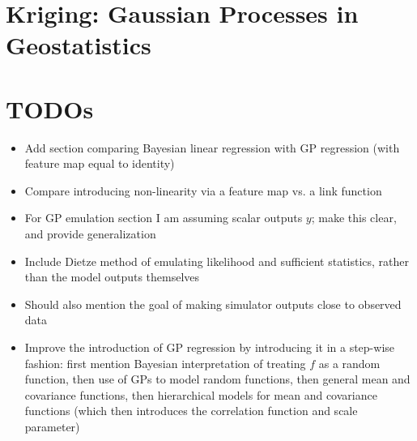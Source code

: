 \documentclass[12pt]{article}
\begin{document}
\section{Kriging: Gaussian Processes in Geostatistics}

\section{TODOs}
\begin{itemize}
\item Add section comparing Bayesian linear regression with GP regression (with feature map equal to identity)
\item Compare introducing non-linearity via a feature map vs. a link function 
\item For GP emulation section I am assuming scalar outputs $y$; make this clear, and provide generalization
\item Include Dietze method of emulating likelihood and sufficient statistics, rather than the model outputs themselves
\item Should also mention the goal of making simulator outputs close to observed data
\item Improve the introduction of GP regression by introducing it in a step-wise fashion: first mention Bayesian interpretation of treating $f$ as a random function, then use of GPs to model random functions, then general mean and covariance functions, then hierarchical models for mean and covariance functions (which then introduces the correlation function and scale parameter)
\end{itemize}
\end{document}
